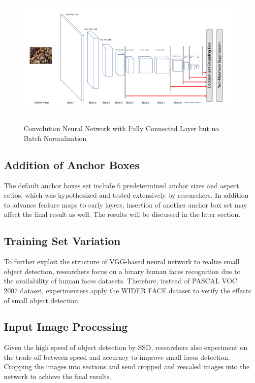\documentclass{article}
\begin{document}
\begin{figure}
	\centering
	\includegraphics[height=7cm]{VGGSSDOriginal.png}
	\caption{Convolution Neural Network with Fully Connected Layer but no Batch Normalization}	
	\label{F1}
	\end{figure}


\subsection{Addition of Anchor Boxes}

The default anchor boxes set include 6 predetermined anchor sizes and aspect ratios, which was hypothesized and tested extensively by researchers. In addition to advance feature maps to early layers, insertion of another anchor box set may affect the final result as well. The results will be discussed in the later section.

\subsection{Training Set Variation}

To further exploit the structure of VGG-based neural network to realize small object detection, researchers focus on a binary human faces recognition due to the availability of human faces datasets. Therefore, instead of PASCAL VOC 2007 dataset, experimenters apply the WIDER FACE dataset to verify the effects of small object detection. 

\subsection{Input Image Processing}

Given the high speed of object detection by SSD, researchers also experiment on the trade-off between speed and accuracy to improve small faces detection. Cropping the images into sections and send cropped and rescaled images into the network to achieve the final results.
\end{document}

